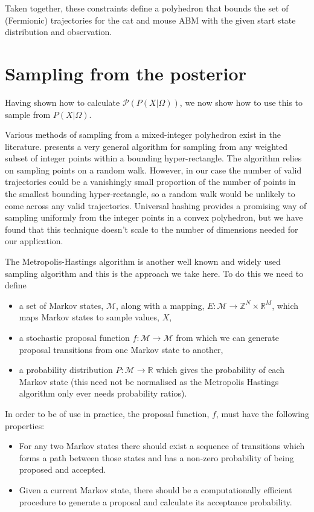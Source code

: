 \documentclass{article}
\begin{document}
Taken together, these constraints define a polyhedron that bounds the set of (Fermionic) trajectories for the cat and mouse ABM with the given start state distribution and observation.

\section{Sampling from the posterior}
\label{samplingFromThePosterior}
Having shown how to calculate $\mathcal{P}(P(X|\Omega))$, we now show how to use this to sample from $P(X|\Omega)$.

Various methods of sampling from a mixed-integer polyhedron exist in the literature. \citet{baumert2009discrete} presents a very general algorithm for sampling from any weighted subset of integer points within a bounding hyper-rectangle. The algorithm relies on sampling points on a random walk. However, in our case the number of valid trajectories could be a vanishingly small proportion of the number of points in the smallest bounding hyper-rectangle, so a random walk would be unlikely to come across any valid trajectories. Universal hashing \citep{meel2016constrained} provides a promising way of sampling uniformly from the integer points in a convex polyhedron, but we have found that this technique doesn't scale to the number of dimensions needed for our application.

The Metropolis-Hastings algorithm is another well known and widely used sampling algorithm and this is the approach we take here. To do this we need to define
\begin{itemize}
\item a set of Markov states, $\mathcal{M}$, along with a mapping, $E:\mathcal{M} \to \mathbb{Z}^N \times \mathbb{R}^M$, which maps Markov states to sample values, $X$,

\item a stochastic proposal function $f:\mathcal{M} \to \mathcal{M}$ from which we can generate proposal transitions from one Markov state to another,

\item a probability distribution $P: \mathcal{M} \to \mathbb{R}$ which gives the probability of each Markov state (this need not be normalised as the Metropolis Hastings algorithm only ever needs probability ratios).

\end{itemize}

In order to be of use in practice, the proposal function, $f$, must have the following properties:
\begin{itemize}
	\item For any two Markov states there should exist a sequence of transitions which forms a path between those states and has a non-zero probability of being proposed and accepted.
	
	\item Given a current Markov state, there should be a computationally efficient procedure to generate a proposal and calculate its acceptance probability. 
\end{itemize}
\end{document}
